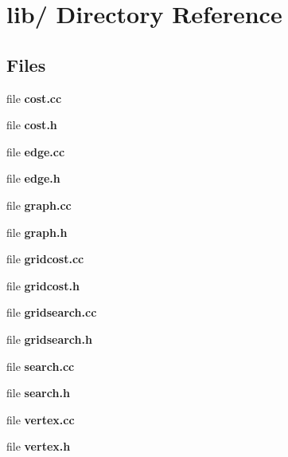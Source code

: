\section{lib/ Directory Reference}
\label{dir_ac065dc6451bcfeb421b40aabd266dd1}
\subsection*{Files}
\begin{DoxyCompactItemize}
\item 
file {\bf cost.cc}
\item 
file {\bf cost.h}
\item 
file {\bf edge.cc}
\item 
file {\bf edge.h}
\item 
file {\bf graph.cc}
\item 
file {\bf graph.h}
\item 
file {\bf gridcost.cc}
\item 
file {\bf gridcost.h}
\item 
file {\bf gridsearch.cc}
\item 
file {\bf gridsearch.h}
\item 
file {\bf search.cc}
\item 
file {\bf search.h}
\item 
file {\bf vertex.cc}
\item 
file {\bf vertex.h}
\end{DoxyCompactItemize}
